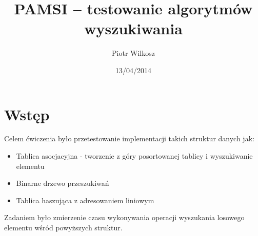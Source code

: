 \documentclass[a4paper,11pt]{article}
\date{13/04/2014}
\title{PAMSI -- testowanie algorytmów wyszukiwania}
\author{Piotr Wilkosz}
\begin{document}
\maketitle

\section{Wstęp}
Celem ćwiczenia było przetestowanie implementacji takich struktur danych jak:
  \begin{itemize}
   \item Tablica asocjacyjna - tworzenie z góry posortowanej tablicy i wyszukiwanie elementu
   \item Binarne drzewo przeszukiwań
   \item Tablica haszująca z adresowaniem liniowym
  \end{itemize}
Zadaniem było zmierzenie czasu wykonywania operacji wyszukania losowego elementu wśród powyższych struktur.
\end{document}
